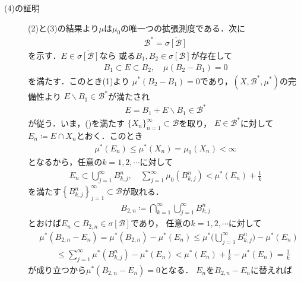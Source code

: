 \begin{prf}
\begin{description}
				\item[(4)の証明]
					(2)と(3)の結果より$\mu$は$\mu_0$の唯一つの拡張測度である．次に
					\begin{align}
						\mathcal{B}^* = \overline{\sigma[\mathcal{B}]}
						\label{eq:appendix_finite_additive_measure_expansion_4}
					\end{align}
					を示す．$E \in \overline{\sigma[\mathcal{B}]}$なら
					或る$B_1,B_2 \in \sigma[\mathcal{B}]$が存在して
					\begin{align}
						B_1 \subset E \subset B_2, \quad \mu(B_2 - B_1) = 0
					\end{align}
					を満たす．このとき(1)より
					$\mu^*(B_2 - B_1) = 0$であり，$\left( X,\mathcal{B}^*,\mu^* \right)$の完備性より
					$E \backslash B_1 \in \mathcal{B}^*$が満たされ
					\begin{align}
						E = B_1 + E \backslash B_1 \in \mathcal{B}^*
					\end{align}
					が従う．いま，()を満たす
					$\{X_n\}_{n=1}^\infty \subset \mathcal{B}$を取り，
					$E \in \mathcal{B}^*$に対して$E_n \coloneqq E \cap X_n$とおく．このとき
					\begin{align}
						\mu^*(E_n) \leq \mu^*(X_n) = \mu_0(X_n) < \infty
					\end{align}
					となるから，任意の$k = 1,2,\cdots$に対して
					\begin{align}
						E_n \subset \bigcup_{j=1}^\infty B^n_{k,j},
						\quad
						\sum_{j=1}^\infty \mu_0\left( B^n_{k,j} \right)
						< \mu^*(E_n) + \frac{1}{k}
					\end{align}
					を満たす$\left\{B^n_{k,j}\right\}_{j=1}^\infty \subset \mathcal{B}$が取れる．
					\begin{align}
						B_{2,n} \coloneqq \bigcap_{k=1}^\infty \bigcup_{j=1}^\infty B^n_{k,j}
					\end{align}
					とおけば$E_n \subset B_{2,n} \in \sigma[\mathcal{B}]$であり，
					任意の$k = 1,2,\cdots$に対して
					\begin{align}
						&\mu^*(B_{2,n} - E_n) = \mu^*(B_{2,n}) - \mu^*(E_n)
						\leq \mu^*\Biggl( \bigcup_{j=1}^\infty B^n_{k,j} \Biggr) - \mu^*(E_n) \\
						&\qquad \leq \sum_{j=1}^\infty \mu^*\left( B^n_{k,j} \right) - \mu^*(E_n)
						< \mu^*(E_n) + \frac{1}{k} - \mu^*(E_n)
						= \frac{1}{k}
					\end{align}
					が成り立つから$\mu^*(B_{2,n} - E_n) = 0$となる．
					$E_n$を$B_{2,n} - E_n$に替えれば
					\begin{align}

\end{align}
\end{description}
\end{prf}
